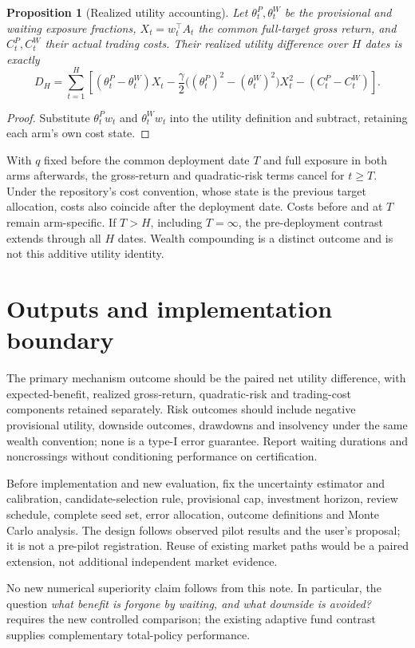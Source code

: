 \documentclass[11pt,a4paper]{article}
\newtheorem{proposition}{Proposition}
\begin{document}
\begin{proposition}[Realized utility accounting]
Let $\theta^P_t,\theta^W_t$ be the provisional and waiting exposure fractions,
$X_t=w_t^\top A_t$ the common full-target gross return, and $C^P_t,C^W_t$
their actual trading costs. Their realized utility difference over $H$ dates
is exactly
\[
 D_H=\sum_{t=1}^H
 \left[(\theta^P_t-\theta^W_t)X_t
 -\frac{\gamma}{2}\bigl((\theta^P_t)^2-(\theta^W_t)^2\bigr)X_t^2
 -(C^P_t-C^W_t)\right].
\]
\end{proposition}
\begin{proof}
Substitute $\theta^P_tw_t$ and $\theta^W_tw_t$ into the utility definition
and subtract, retaining each arm's own cost state.
\end{proof}
With $q$ fixed before the common deployment date $T$ and full exposure in
both arms afterwards, the gross-return and quadratic-risk terms cancel for
$t\ge T$. Under the repository's cost convention, whose state is the previous
target allocation, costs also coincide after the deployment date. Costs
before and at $T$ remain arm-specific. If $T>H$, including $T=\infty$, the
pre-deployment contrast extends through all $H$ dates. Wealth compounding is
a distinct outcome and is not this additive utility identity.

\section{Outputs and implementation boundary}
The primary mechanism outcome should be the paired net utility difference,
with expected-benefit, realized gross-return, quadratic-risk and trading-cost
components retained separately. Risk outcomes should include negative
provisional utility, downside outcomes, drawdowns and insolvency under the
same wealth convention; none is a type-I error guarantee. Report waiting
durations and noncrossings without conditioning performance on certification.

Before implementation and new evaluation, fix the uncertainty estimator and
calibration, candidate-selection rule, provisional cap, investment horizon,
review schedule, complete seed set, error allocation, outcome definitions
and Monte Carlo analysis. The design follows observed pilot results and the
user's proposal; it is not a pre-pilot registration. Reuse of existing market
paths would be a paired extension, not additional independent market evidence.

No new numerical superiority claim follows from this note. In particular,
the question \emph{what benefit is forgone by waiting, and what downside is
avoided?} requires the new controlled comparison; the existing adaptive fund
contrast supplies complementary total-policy performance.
\end{document}
